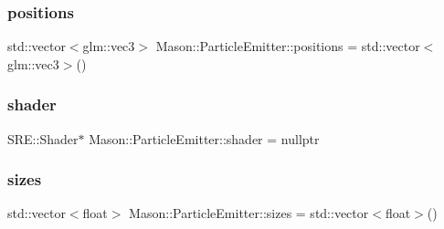 \hypertarget{class_mason_1_1_particle_emitter_a9398d92e4bed89396c02d4c028ba3e69}{}\label{class_mason_1_1_particle_emitter_a9398d92e4bed89396c02d4c028ba3e69} 
\subsubsection{\texorpdfstring{positions}{positions}}
{\footnotesize\ttfamily std\+::vector$<$glm\+::vec3$>$ Mason\+::\+Particle\+Emitter\+::positions = std\+::vector$<$glm\+::vec3$>$()\hspace{0.3cm}{\ttfamily [protected]}}

\hypertarget{class_mason_1_1_particle_emitter_abd604dd44e85f836580c40bf8d147a2c}{}\label{class_mason_1_1_particle_emitter_abd604dd44e85f836580c40bf8d147a2c} 
\subsubsection{\texorpdfstring{shader}{shader}}
{\footnotesize\ttfamily S\+R\+E\+::\+Shader$\ast$ Mason\+::\+Particle\+Emitter\+::shader = nullptr\hspace{0.3cm}{\ttfamily [protected]}}

\hypertarget{class_mason_1_1_particle_emitter_a6209f3a86719de038574edafc0eaa194}{}\label{class_mason_1_1_particle_emitter_a6209f3a86719de038574edafc0eaa194} 
\subsubsection{\texorpdfstring{sizes}{sizes}}
{\footnotesize\ttfamily std\+::vector$<$float$>$ Mason\+::\+Particle\+Emitter\+::sizes = std\+::vector$<$float$>$()\hspace{0.3cm}{\ttfamily [protected]}}

\hypertarget{class_mason_1_1_particle_emitter_a46d4d3d2871daba6f320dfbc1f89ace1}{}\label{class_mason_1_1_particle_emitter_a46d4d3d2871daba6f320dfbc1f89ace1} 
